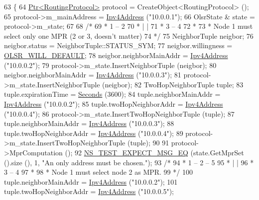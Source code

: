 \begin{DoxyCode}
63 \{
64   \hyperlink{classns3_1_1Ptr}{Ptr<RoutingProtocol>} protocol = CreateObject<RoutingProtocol> ();
65   protocol->m\_mainAddress = \hyperlink{classns3_1_1Ipv4Address}{Ipv4Address} (\textcolor{stringliteral}{"10.0.0.1"});
66   OlsrState & state = protocol->m\_state;
67 
68   \textcolor{comment}{/*}
69 \textcolor{comment}{   *  1 -- 2}
70 \textcolor{comment}{   *  |    |}
71 \textcolor{comment}{   *  3 -- 4}
72 \textcolor{comment}{   *}
73 \textcolor{comment}{   * Node 1 must select only one MPR (2 or 3, doesn't matter)}
74 \textcolor{comment}{   */}
75   NeighborTuple neigbor;
76   neigbor.status = NeighborTuple::STATUS\_SYM;
77   neigbor.willingness = \hyperlink{olsr-routing-protocol-test-suite_8cc_a0b87d49ad8114eabe8dd6eecfb6858e1}{OLSR\_WILL\_DEFAULT};
78   neigbor.neighborMainAddr = \hyperlink{classns3_1_1Ipv4Address}{Ipv4Address} (\textcolor{stringliteral}{"10.0.0.2"});
79   protocol->m\_state.InsertNeighborTuple (neigbor);
80   neigbor.neighborMainAddr = \hyperlink{classns3_1_1Ipv4Address}{Ipv4Address} (\textcolor{stringliteral}{"10.0.0.3"});
81   protocol->m\_state.InsertNeighborTuple (neigbor);
82   TwoHopNeighborTuple tuple;
83   tuple.expirationTime = \hyperlink{group__timecivil_ga33c34b816f8ff6628e33d5c8e9713b9e}{Seconds} (3600);
84   tuple.neighborMainAddr = \hyperlink{classns3_1_1Ipv4Address}{Ipv4Address} (\textcolor{stringliteral}{"10.0.0.2"});
85   tuple.twoHopNeighborAddr = \hyperlink{classns3_1_1Ipv4Address}{Ipv4Address} (\textcolor{stringliteral}{"10.0.0.4"});
86   protocol->m\_state.InsertTwoHopNeighborTuple (tuple);
87   tuple.neighborMainAddr = \hyperlink{classns3_1_1Ipv4Address}{Ipv4Address} (\textcolor{stringliteral}{"10.0.0.3"});
88   tuple.twoHopNeighborAddr = \hyperlink{classns3_1_1Ipv4Address}{Ipv4Address} (\textcolor{stringliteral}{"10.0.0.4"});
89   protocol->m\_state.InsertTwoHopNeighborTuple (tuple);
90 
91   protocol->MprComputation ();
92   \hyperlink{group__testing_ga7304ba46a28d8cf08dfdfd6499cf7068}{NS\_TEST\_EXPECT\_MSG\_EQ} (state.GetMprSet ().size (), 1, \textcolor{stringliteral}{"An only address must be
       chosen."});
93   \textcolor{comment}{/*}
94 \textcolor{comment}{   *  1 -- 2 -- 5}
95 \textcolor{comment}{   *  |    |}
96 \textcolor{comment}{   *  3 -- 4}
97 \textcolor{comment}{   *}
98 \textcolor{comment}{   * Node 1 must select node 2 as MPR.}
99 \textcolor{comment}{   */}
100   tuple.neighborMainAddr = \hyperlink{classns3_1_1Ipv4Address}{Ipv4Address} (\textcolor{stringliteral}{"10.0.0.2"});
101   tuple.twoHopNeighborAddr = \hyperlink{classns3_1_1Ipv4Address}{Ipv4Address} (\textcolor{stringliteral}{"10.0.0.5"});

\end{DoxyCode}

